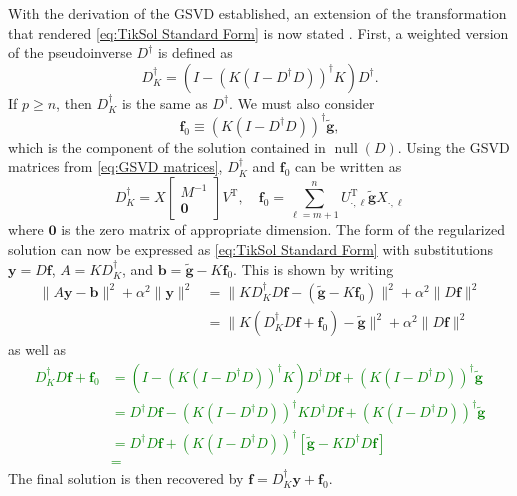 \documentclass[12pt,notitlepage]{report}
\newcommand{\gnoiseVec}{\widetilde{\mathbf{g}}}	%
\newcommand{\kMat}{K}	%
\newcommand{\fVec}{\mathbf{f}}	%
\newcommand{\trans}{\mathrm{T}}	%
\DeclareMathOperator{\nullspace}{null}	%
\newcommand{\regparam}{\alpha}
\newcommand{\ToDo}[1]{\textcolor{green}{\textbf{#1}}}
\begin{document}
With the derivation of the GSVD established, an extension of the transformation that rendered \eqref{eq:TikSol Standard Form} is now stated \cite[p.~38]{Hansen:98}. First, a weighted version of the pseudoinverse $D^\dagger$ is defined as
\[D_{\kMat}^\dagger = \left(I - \left(\kMat\left(I - D^\dagger D\right)\right)^\dagger \kMat\right)D^\dagger.\]
If $p \geq n$, then $D_{\kMat}^\dagger$ is the same as $D^\dagger$. We must also consider
\[\fVec_0 \equiv \left(\kMat\left(I - D^\dagger D\right)\right)^\dagger \gnoiseVec,\]
which is the component of the solution contained in $\nullspace(D)$.  Using the GSVD matrices from \eqref{eq:GSVD matrices}, $D_{\kMat}^\dagger$ and $\fVec_0$ can be written as
\begin{equation}
\label{eq:Trans. 1}
D_{\kMat}^\dagger = X \begin{bmatrix}
M^{-1} \\
\mathbf{0}
\end{bmatrix}V^\trans, \quad \fVec_0 = \sum_{\ell=m+1}^{n} U_{\cdot,\ell}^\trans\gnoiseVec X_{\cdot,\ell}
\end{equation}
where $\bm{0}$ is the zero matrix of appropriate dimension. The form of the regularized solution can now be expressed as \eqref{eq:TikSol Standard Form} with substitutions $\mathbf{y} = D\fVec$, $A = \kMat{D_{\kMat}^\dagger}$, and $\mathbf{b} = \gnoiseVec - \kMat\fVec_0$. This is shown by writing
\begin{align*}
\|A\mathbf{y} - \mathbf{b}\|^2 + \regparam^2\|\mathbf{y}\|^2 &= \|\kMat{D_{\kMat}^\dagger}D\fVec - (\gnoiseVec - \kMat\fVec_0)\|^2 + \regparam^2\|D\fVec\|^2 \\
&=  \|\kMat({D_{\kMat}^\dagger}D\fVec + \fVec_0) - \gnoiseVec\|^2 + \regparam^2\|D\fVec\|^2
\end{align*}
as well as 
\ToDo{
\begin{align*}
{D_{\kMat}^\dagger}D\fVec + \fVec_0 &= \left(I - \left(\kMat\left(I - D^\dagger D\right)\right)^\dagger \kMat\right)D^\dagger D\fVec + \left(\kMat\left(I - D^\dagger D\right)\right)^\dagger \gnoiseVec \\
&= D^\dagger D\fVec - \left(\kMat\left(I - D^\dagger D\right)\right)^\dagger \kMat D^\dagger D\fVec + \left(\kMat\left(I - D^\dagger D\right)\right)^\dagger \gnoiseVec \\ 
&= D^\dagger D\fVec + \left(\kMat\left(I - D^\dagger D\right)\right)^\dagger \left[\gnoiseVec - \kMat D^\dagger D\fVec\right] \\
&= 
\end{align*}}
The final solution is then recovered by $\fVec = D_{\kMat}^\dagger \mathbf{y} + \fVec_0$. 
\end{document}
